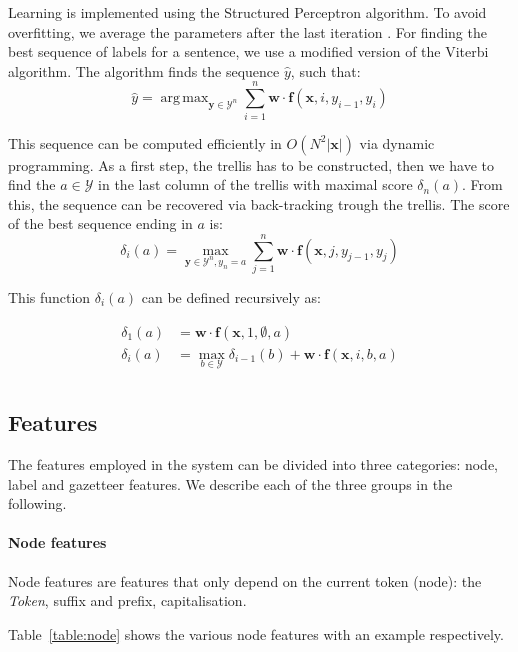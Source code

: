 \documentclass[11pt]{article}
\DeclareMathOperator*{\argmax}{arg\,max}
\begin{document}
Learning is implemented using the Structured Perceptron algorithm. To avoid overfitting, we average the parameters after the last iteration \cite{collins2002discriminative}. 
For finding the best sequence of labels for a sentence, we use a modified version of the Viterbi algorithm. The algorithm finds the sequence $\hat{y}$, such that:
\[
\hat{y} = \argmax_{\mathbf{y} \in \mathcal{Y}^{n}} \sum_{i=1}^{n}\mathbf{w} \cdot \boldsymbol{f}(\mathbf{x}, i, y_{i-1}, y_{i})
\]

This sequence can be computed efficiently in $ O( N^2 |\mathbf{x}| ) $ via dynamic programming. 
As a first step, the trellis has to be constructed, then we have to find the $ a \in \mathcal{Y}$ in the 
last column of the trellis with maximal score $\delta_n(a)$. From this, the sequence can be recovered via back-tracking trough the trellis. 
The score of the best sequence ending in $a$ is:
\[
\delta_i(a) = \max_{\mathbf{y} \in \mathcal{Y}^{n}, y_n = a} \sum_{j=1}^{n}{\mathbf{w} \cdot \boldsymbol{f}(\mathbf{x}, j, y_{j-1}, y_{j})}
\]

\noindent This function $\delta_i(a)$ can be defined recursively as:

\begin{align*}
\delta_1(a) &= \mathbf{w} \cdot \boldsymbol{f}(\mathbf{x}, 1, \emptyset, a) \\
\delta_i(a) &= \max_{b \in \mathcal{Y}} \delta_{i-1}(b) + \mathbf{w} \cdot \boldsymbol{f}(\mathbf{x}, i, b, a) \\
\end{align*}


\subsection{Features}
The features employed in the system can be divided into three categories: node, label and gazetteer features. 
We describe each of the three groups in the following.

\paragraph*{Node features}
Node features are features that only depend on the current token (node): the \emph{Token}, suffix and prefix, capitalisation.

Table~\ref{table:node} shows the various node features with an example respectively.
\end{document}
